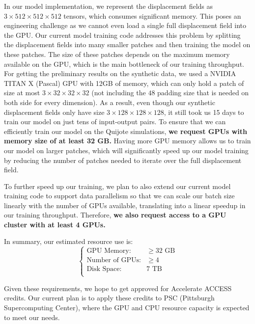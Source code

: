 \documentclass[10pt]{article}
\begin{document}
In our model implementation, we represent the displacement fields as $3 \times 512 \times 512 \times 512$ tensors, which consumes significant memory. This poses an engineering challenge as we cannot even load a single full displacement field into the GPU. Our current model training code addresses this problem by splitting the displacement fields into many smaller patches and then training the model on these patches. The size of these patches depends on the maximum memory available on the GPU, which is the main bottleneck of our training throughput. For getting the preliminary results on the synthetic data, we used a NVIDIA TITAN X (Pascal) GPU with 12GB of memory, which can only hold a patch of size at most $3 \times 32 \times 32 \times 32$ (not including the $48$ padding size that is needed on both side for every dimension). As a result, even though our synthetic displacement fields only have size $3 \times 128 \times 128 \times 128$, it still took us 15 days to train our model on just tens of input-output pairs. To ensure that we can efficiently train our model on the Quijote simulations, \textbf{we request GPUs with memory size of at least 32 GB.} Having more GPU memory allows us to train our model on larger patches, which will significantly speed up our model training by reducing the number of patches needed to iterate over the full displacement field.

To further speed up our training, we plan to also extend our current model training code to support data parallelism so that we can scale our batch size linearly with the number of GPUs available, translating into a linear speedup in our training throughput. Therefore, \textbf{we also request access to a GPU cluster with at least 4 GPUs.}

In summary, our estimated resource use is:
$$
\begin{cases}
  \text{GPU Memory:} & \geq 32 \text{ GB} \\
  \text{Number of GPUs:} & \geq 4 \\
  \text{Disk Space:} & 7 \text{ TB} \\
\end{cases}
$$

Given these requirements, we hope to get approved for Accelerate ACCESS credits. Our current plan is to apply these credits to PSC (Pittsburgh Supercomputing Center), where the GPU and CPU resource capacity is expected to meet our needs.

\pagebreak

\printbibliography
\end{document}
